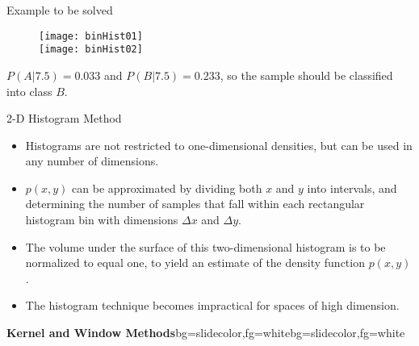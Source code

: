 \begin{frame}{Example to be solved}
\begin{figure}
\texttt{[image: binHist01]}\\
\texttt{[image: binHist02]}
\end{figure}
$P(A|7.5)=0.033$ and $P(B|7.5)=0.233$, so the sample should be classified into class $B$.
\end{frame}

\begin{frame}{2-D Histogram Method}
\begin{itemize}
\item Histograms are not restricted to one-dimensional densities, but can be used in any number of dimensions.
\item $p(x,y)$ can be approximated by dividing both $x$ and $y$ into intervals, and determining the number of samples that fall within each rectangular histogram bin with dimensions $\Delta x$ and $\Delta y$.
\item The volume under the surface of this two-dimensional histogram is to be normalized to equal one, to yield an estimate of the density function $p(x,y)$.
\item The histogram technique becomes impractical for spaces of high dimension.
\end{itemize}
\end{frame}

\begin{frame}{}
\begin{variableblock}{\centering \Large \textbf{\vspace{4pt}\newline Kernel and Window Methods\vspace{4pt}}}{bg=slidecolor,fg=white}{bg=slidecolor,fg=white}
\end{variableblock}
\end{frame}


